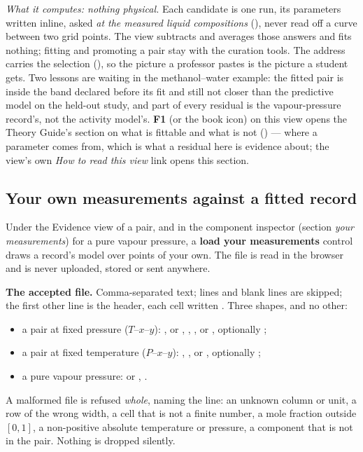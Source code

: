 \documentclass[11pt,a4paper]{article}
\begin{document}
\emph{What it computes: nothing physical.}  Each candidate is one
 run, its parameters written inline, asked \emph{at the
measured liquid compositions} (), never
read off a curve between two grid points.  The view subtracts and averages
those answers and fits nothing; fitting and promoting a pair stay with the
curation tools.  The address carries the selection
(), so the picture a
professor pastes is the picture a student gets.  Two lessons are waiting in
the methanol--water example: the fitted pair is inside the band declared
before its fit and still not closer than the predictive model on the
held-out study, and part of every residual is the vapour-pressure record's,
not the activity model's.  \textbf{F1} (or the book icon) on this view
opens the Theory Guide's section on what is fittable and what is not
() --- where a parameter comes from, which is what a
residual here is evidence about; the view's own \emph{How to read this
view} link opens this section.

\subsection{Your own measurements against a fitted record}\label{sec:explorer-own-points}
Under the Evidence view of a pair, and in the component inspector (section
\emph{your measurements}) for a pure vapour pressure, a \textbf{load your
measurements} control draws a record's model over points of your own.  The
file is read in the browser and is never uploaded, stored or sent anywhere.

\textbf{The accepted file.}  Comma-separated text; \code{\#} lines and blank
lines are skipped; the first other line is the header, each cell written
.  Three shapes, and no other:
\begin{itemize}
\item a pair at fixed pressure ($T$--$x$--$y$):
  ,  or , ,
  ,  or , optionally ;
\item a pair at fixed temperature ($P$--$x$--$y$): ,
  ,  or , optionally ;
\item a pure vapour pressure:  or , .
\end{itemize}
A malformed file is refused \emph{whole}, naming the line: an unknown column or
unit, a row of the wrong width, a cell that is not a finite number, a mole
fraction outside $[0,1]$, a non-positive absolute temperature or pressure, a
component that is not in the pair.  Nothing is dropped silently.
\end{document}
